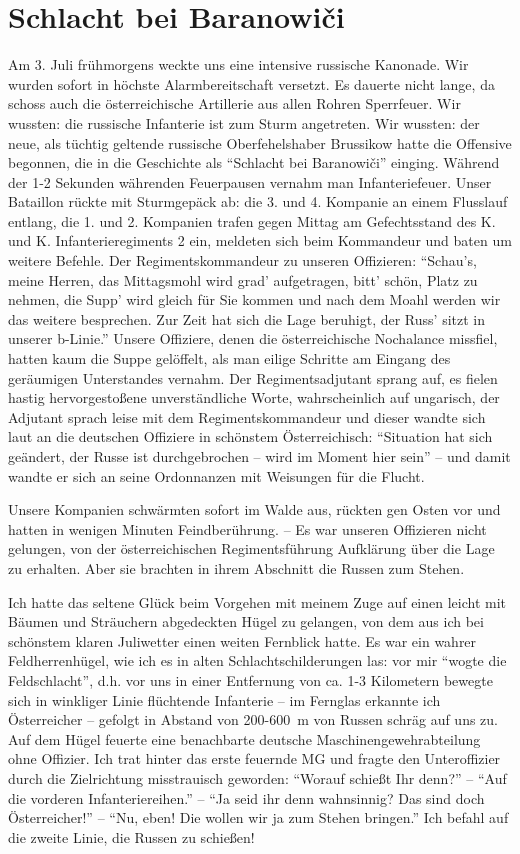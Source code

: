 \documentclass[a5paper,pagesize,10pt,twoside=true]{scrbook}
\begin{document}
\section{Schlacht bei Baranowiči}
Am 3. Juli frühmorgens weckte uns eine intensive russische Kanonade. Wir wurden sofort in höchste Alarmbereitschaft versetzt. Es dauerte nicht lange, da schoss auch die österreichische Artillerie aus allen Rohren Sperrfeuer. Wir wussten: die russische Infanterie ist zum Sturm angetreten. Wir wussten: der neue, als tüchtig geltende russische Oberfehelshaber Brussikow hatte die Offensive begonnen, die in die Geschichte als \enquote{Schlacht bei Baranowiči} einging. Während der 1-2 Sekunden währenden Feuerpausen vernahm man Infanteriefeuer. Unser Bataillon rückte mit Sturmgepäck ab: die 3. und 4. Kompanie an einem Flusslauf entlang, die 1. und 2. Kompanien trafen gegen Mittag am Gefechtsstand des K. und K. Infanterieregiments 2 ein, meldeten sich beim Kommandeur und baten um weitere Befehle. Der Regimentskommandeur zu unseren Offizieren: \enquote{Schau's, meine Herren, das Mittagsmohl wird grad' aufgetragen, bitt' schön, Platz zu nehmen, die Supp' wird gleich für Sie kommen und nach dem Moahl werden wir das weitere besprechen. Zur Zeit hat sich die Lage beruhigt, der Russ' sitzt in unserer b-Linie.} Unsere Offiziere, denen die österreichische Nochalance missfiel, hatten kaum die Suppe gelöffelt, als man eilige Schritte am Eingang des geräumigen Unterstandes vernahm. Der Regimentsadjutant sprang auf, es fielen hastig hervorgestoßene unverständliche Worte, wahrscheinlich auf ungarisch, der Adjutant sprach leise mit dem Regimentskommandeur und dieser wandte sich laut an die deutschen Offiziere in schönstem Österreichisch: \enquote{Situation hat sich geändert, der Russe ist durchgebrochen -- wird im Moment hier sein} -- und damit wandte er sich an seine Ordonnanzen mit Weisungen für die Flucht.

Unsere Kompanien schwärmten sofort im Walde aus, rückten gen Osten vor und hatten in wenigen Minuten Feindberührung. -- Es war unseren Offizieren nicht gelungen, von der österreichischen Regimentsführung Aufklärung über die Lage zu erhalten. Aber sie brachten in ihrem Abschnitt die Russen zum Stehen.

Ich hatte das seltene Glück beim Vorgehen mit meinem Zuge auf einen leicht mit Bäumen und Sträuchern abgedeckten Hügel zu gelangen, von dem aus ich bei schönstem klaren Juliwetter einen weiten Fernblick hatte. Es war ein wahrer Feldherrenhügel, wie ich es in alten Schlachtschilderungen las: vor mir \enquote{wogte die Feldschlacht}, d.h. vor uns in einer Entfernung von ca. 1-3 Kilometern bewegte sich in winkliger Linie flüchtende Infanterie -- im Fernglas erkannte ich Österreicher -- gefolgt in Abstand von 200-600~m von Russen schräg auf uns zu. Auf dem Hügel feuerte eine benachbarte deutsche Maschinengewehrabteilung ohne Offizier. Ich trat hinter das erste feuernde MG und fragte den Unteroffizier durch die Zielrichtung misstrauisch geworden: \enquote{Worauf schießt Ihr denn?} -- \enquote{Auf die vorderen Infanteriereihen.} -- \enquote{Ja seid ihr denn wahnsinnig? Das sind doch Österreicher!} -- \enquote{Nu, eben! Die wollen wir ja zum Stehen bringen.} Ich befahl auf die zweite Linie, die Russen zu schießen!
\end{document}
